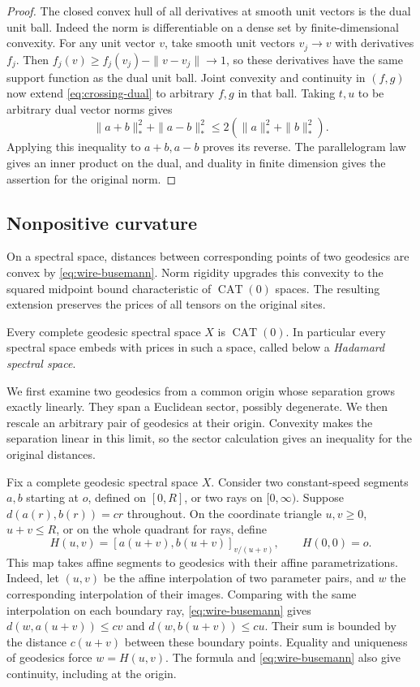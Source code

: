\begin{proof}
The closed convex hull of all derivatives at smooth unit vectors
is the dual unit ball. Indeed the norm is differentiable on a dense
set by finite-dimensional convexity. For any unit vector $v$, take
smooth unit vectors $v_j\to v$ with derivatives $f_j$. Then
$f_j(v)\ge f_j(v_j)-\|v-v_j\|\to1$, so these derivatives have the
same support function as the dual unit ball. Joint convexity and
continuity in $(f,g)$ now extend \eqref{eq:crossing-dual} to arbitrary
$f,g$ in that ball. Taking $t,u$ to be arbitrary dual vector norms
gives
\[
   \|a+b\|_*^2+\|a-b\|_*^2\le 2(\|a\|_*^2+\|b\|_*^2).
\]
Applying this inequality to $a+b,a-b$ proves its reverse. The
parallelogram law gives an inner product on the dual, and duality in
finite dimension gives the assertion for the original norm.
\end{proof}

\subsection{Nonpositive curvature}\label{sec:curvature}
On a spectral space, distances between corresponding points of two
geodesics are convex by \eqref{eq:wire-busemann}. Norm rigidity upgrades
this convexity to the squared midpoint bound characteristic of
$\operatorname{CAT}(0)$ spaces. The resulting extension preserves the prices of all
tensors on the original sites.
\begin{theorem}[Curvature]\label{thm:geometry}
Every complete geodesic spectral space $X$ is $\operatorname{CAT}(0)$.
In particular every spectral space embeds with prices in such a space, called below a \emph{Hadamard spectral space}.
\end{theorem}
We first examine two geodesics from a common origin whose separation
grows exactly linearly. They span a Euclidean sector, possibly
degenerate. We then rescale an arbitrary pair of geodesics at their
origin. Convexity makes the separation linear in this limit, so the
sector calculation gives an inequality for the original distances.

Fix a complete geodesic spectral space $X$.
Consider two constant-speed segments $a,b$ starting at $o$, defined on $[0,R]$, or two rays on $[0,\infty)$. Suppose $d(a(r),b(r))=cr$ throughout. On the coordinate triangle $u,v\ge0$, $u+v\le R$, or on the whole quadrant for rays, define
\[
 H(u,v)=[a(u+v),b(u+v)]_{v/(u+v)},\qquad H(0,0)=o.
\]
This map takes affine segments to geodesics with their affine parametrizations. Indeed, let $(u,v)$ be the affine interpolation of two parameter pairs, and $w$ the corresponding interpolation of their images. Comparing with the same interpolation on each boundary ray, \eqref{eq:wire-busemann} gives $d(w,a(u+v))\le cv$ and $d(w,b(u+v))\le cu$. Their sum is bounded by the distance $c(u+v)$ between these boundary points. Equality and uniqueness of geodesics force $w=H(u,v)$. The formula and \eqref{eq:wire-busemann} also give continuity, including at the origin.

